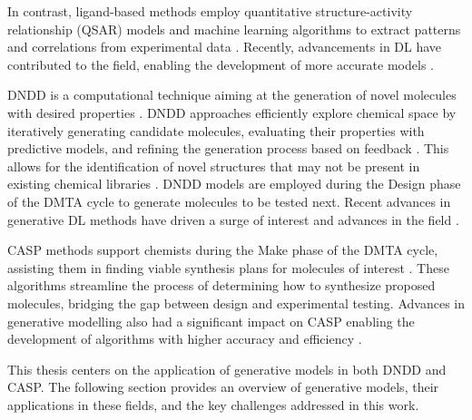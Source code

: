 In contrast, ligand-based methods employ quantitative structure-activity relationship (QSAR) models and machine learning
algorithms to extract patterns and correlations from experimental data \citep{cherkasovQSARModelingWhere2014}.
Recently, advancements in \ac{DL} have contributed to the field, enabling the development of more accurate models
\citep{lusciDeepArchitecturesDeep2013,unterthinerDeepLearningOpportunity2015,chenRiseDeepLearning2018,hochreiterMachineLearningDrug2018,mayrLargescaleComparisonMachine2018,stanleyFSMolFewShotLearning2021,seidlEnhancingActivityPrediction2023}.

\Ac{DNDD} is a computational technique aiming at the generation of novel molecules with desired properties
\citep{schneiderNovoMolecularDesign2013}. \ac{DNDD} approaches efficiently explore chemical space by iteratively
generating candidate molecules, evaluating their properties with predictive models, and refining the generation process
based on feedback \citep{gaoSampleEfficiencyMatters2022}. This allows for the identification of novel structures that
may not be present in existing chemical libraries \citep{brownGuacaMolBenchmarkingModels2019}. \ac{DNDD} models are
employed during the Design phase of the \ac{DMTA} cycle to generate molecules to be tested next. Recent advances in
generative \ac{DL} methods
\citep{bond-taylorDeepGenerativeModelling2022,brownLanguageModelsAre2020,goodfellowGenerativeAdversarialNets2014,
dinhDensityEstimationUsing2017,kingmaAutoEncodingVariationalBayes2013,hoDenoisingDiffusionProbabilistic2020,vaswaniAttentionAllYou2017}
have driven a surge of interest and advances in the field
\citep{eltonDeepLearningMolecular2019,sanchez-lengelingInverseMolecularDesign2018,ekinsIntroductionGenerativeDrug2025}.

\Ac{CASP} methods support chemists during the Make phase of the \ac{DMTA} cycle, assisting them in finding viable
synthesis plans for molecules of interest
\citep{coreyComputerAssistedDesignComplex1969,coreyLogicChemicalSynthesis1989,seglerPlanningChemicalSyntheses2018}.
These algorithms streamline the process of determining how to synthesize proposed molecules, bridging the gap between
design and experimental testing. Advances in generative modelling also had a significant impact 
on \ac{CASP} enabling the development of algorithms with higher accuracy and efficiency
\citep{coleyMachineLearningComputerAided2018,maziarzReevaluatingRetrosynthesisAlgorithms2024}.

This thesis centers on the application of generative models in both \ac{DNDD} and \ac{CASP}. The following section
provides an overview of generative models, their applications in these fields, and the key challenges addressed in this
work.

